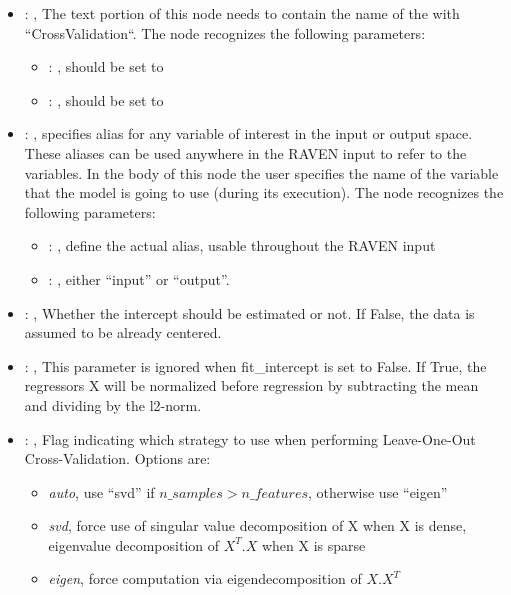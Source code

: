 \begin{itemize}
    \item {}: , 
      The text portion of this node needs to contain the name of the  with
               ``CrossValidation``.
      The  node recognizes the following parameters:
        \begin{itemize}
          \item {}: , 
            should be set to 
          \item {}: , 
            should be set to 
      \end{itemize}

    \item {}: , 
      specifies alias for         any variable of interest in the input or output space. These
      aliases can be used anywhere in the RAVEN input to         refer to the variables. In the body
      of this node the user specifies the name of the variable that the model is going to use
      (during its execution).
      The  node recognizes the following parameters:
        \begin{itemize}
          \item {}: , 
            define the actual alias, usable throughout the RAVEN input
          \item {}: , 
            either ``input'' or ``output''.
      \end{itemize}

    \item {}: , 
      Whether the intercept should be estimated or not. If False,
      the data is assumed to be already centered.

    \item {}: , 
      This parameter is ignored when fit\_intercept is set to False. If True, the
      regressors X will be normalized before regression by subtracting the mean and dividing
      by the l2-norm.

    \item {}: , 
      Flag indicating which strategy to use when performing Leave-One-Out Cross-Validation.
      Options are:                                                  \begin{itemize}
      \item \textit{auto}, use ``svd'' if $n\_samples > n\_features$, otherwise use ``eigen''
      \item \textit{svd}, force use of singular value decomposition of X when X is
      dense, eigenvalue decomposition of $X^T.X$ when X is sparse
      \item \textit{eigen}, force computation via eigendecomposition of $X.X^T$
      \end{itemize}


\end{itemize}

